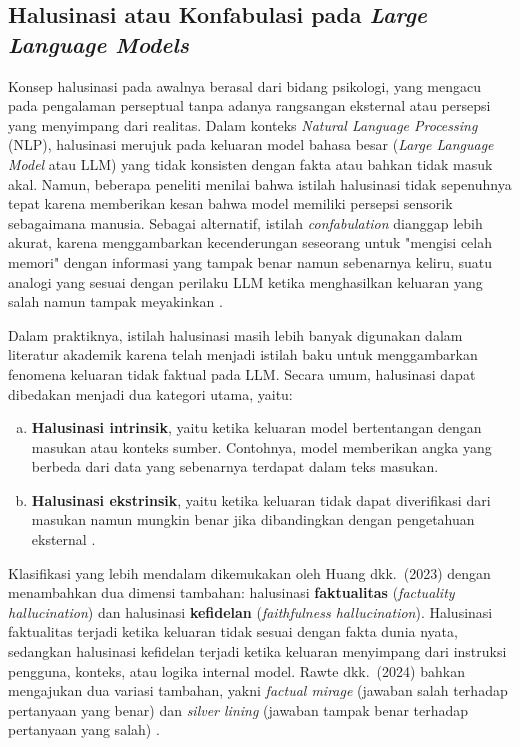 
\subsection{Halusinasi atau Konfabulasi pada \textit{Large Language Models}}
\label{subsec:hallucinations-llm}

Konsep halusinasi pada awalnya berasal dari bidang psikologi, yang mengacu pada pengalaman perseptual tanpa adanya rangsangan eksternal atau persepsi yang menyimpang dari realitas. Dalam konteks \textit{Natural Language Processing} (NLP), halusinasi merujuk pada keluaran model bahasa besar (\textit{Large Language Model} atau LLM) yang tidak konsisten dengan fakta atau bahkan tidak masuk akal. Namun, beberapa peneliti menilai bahwa istilah halusinasi tidak sepenuhnya tepat karena memberikan kesan bahwa model memiliki persepsi sensorik sebagaimana manusia. Sebagai alternatif, istilah \textit{confabulation} dianggap lebih akurat, karena menggambarkan kecenderungan seseorang untuk "mengisi celah memori" dengan informasi yang tampak benar namun sebenarnya keliru, suatu analogi yang sesuai dengan perilaku LLM ketika menghasilkan keluaran yang salah namun tampak meyakinkan \parencite{math2024hallucination}.

Dalam praktiknya, istilah halusinasi masih lebih banyak digunakan dalam literatur akademik karena telah menjadi istilah baku untuk menggambarkan fenomena keluaran tidak faktual pada LLM. Secara umum, halusinasi dapat dibedakan menjadi dua kategori utama, yaitu:
\begin{enumerate}[a.]
  \item \textbf{Halusinasi intrinsik}, yaitu ketika keluaran model bertentangan dengan masukan atau konteks sumber. Contohnya, model memberikan angka yang berbeda dari data yang sebenarnya terdapat dalam teks masukan.
  \item \textbf{Halusinasi ekstrinsik}, yaitu ketika keluaran tidak dapat diverifikasi dari masukan namun mungkin benar jika dibandingkan dengan pengetahuan eksternal \parencite{math2024hallucination}.
\end{enumerate}

Klasifikasi yang lebih mendalam dikemukakan oleh Huang dkk.\ (2023) dengan menambahkan dua dimensi tambahan: halusinasi \textbf{faktualitas} (\textit{factuality hallucination}) dan halusinasi \textbf{kefidelan} (\textit{faithfulness hallucination}). Halusinasi faktualitas terjadi ketika keluaran tidak sesuai dengan fakta dunia nyata, sedangkan halusinasi kefidelan terjadi ketika keluaran menyimpang dari instruksi pengguna, konteks, atau logika internal model.
Rawte dkk.\ (2024) bahkan mengajukan dua variasi tambahan, yakni \textit{factual mirage} (jawaban salah terhadap pertanyaan yang benar) dan \textit{silver lining} (jawaban tampak benar terhadap pertanyaan yang salah) \parencite{math2024hallucination}.

